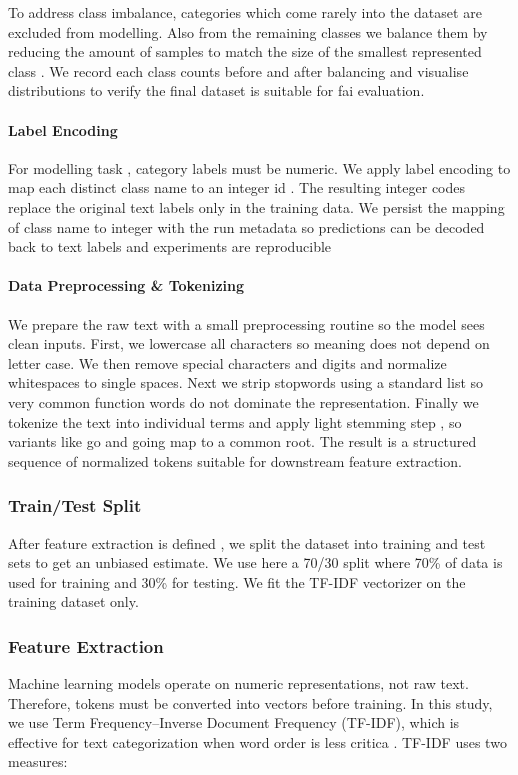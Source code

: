 To address class imbalance, categories which come rarely into the dataset are excluded from modelling. Also from the remaining classes we balance them by reducing the amount of samples to match the size of the smallest represented class \cite{daud:2023}. We record each class counts before and after balancing and visualise distributions to verify the final dataset is suitable for fai evaluation.

\paragraph{Label Encoding}

\smallskip

For modelling task , category labels must be numeric. We apply label encoding to map each distinct class name to an integer id \cite{ahmed:2021}. The resulting integer codes replace the original text labels only in the training data. We persist the mapping of class name to integer with the run metadata so predictions can be decoded back to text labels and experiments are reproducible


\paragraph{Data Preprocessing \& Tokenizing}

\smallskip

We prepare the raw text with a small preprocessing routine so the model sees clean inputs. First, we lowercase all characters so meaning does not depend on letter case. We then remove special characters and digits and normalize whitespaces to single spaces. Next we strip stopwords using a standard list so very common function words do not dominate the representation. Finally we tokenize the text into individual terms and apply light stemming step , so variants like go and going map to a common root. The result is a structured sequence of normalized tokens suitable for downstream feature extraction.


\subsubsection{Train/Test Split}
After feature extraction is defined , we split the dataset into training and test sets to get an unbiased estimate. We use here a 70/30 split where 70\% of data is used for training and 30\% for testing.  We fit the TF-IDF vectorizer on the training dataset only.

\subsubsection{Feature Extraction}
Machine learning models operate on numeric representations, not raw text. Therefore, tokens must be converted into vectors before training. In this study, we use Term Frequency–Inverse Document Frequency (TF-IDF), which is effective for text categorization when word order is less critica \cite{das:2023}. TF-IDF uses two measures:

